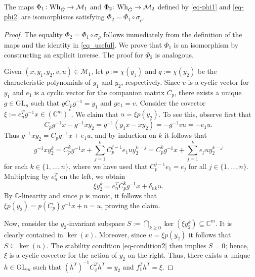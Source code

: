 \documentclass[11pt]{article}
\theoremstyle{definition}
\theoremstyle{plain}
\theoremstyle{remark}
\newcommand{\GL}{\mathrm{GL}}
\newcommand{\numberset}{\mathbb}
\newcommand{\C}{\numberset{C}}
\begin{document}
        \begin{lemma}
            The maps $\Phi_1\colon \mathrm{Wh}_{\Check{G}} \to \mathcal{M}_1$ and $\Phi_2\colon \mathrm{Wh}_{\Check{G}} \to \mathcal{M}_2$ defined by \eqref{eq-phi1} and \eqref{eq-phi2} are isomorphisms satisfying $\Phi_2 = \Phi_1 \circ \sigma_{\rho}$.
        \end{lemma}
        \begin{proof}
            The equality $\Phi_2 = \Phi_1 \circ \sigma_{\rho}$ follows immediately from the definition of the maps and the identity in \eqref{eq_useful}. We prove that $\Phi_1$ is an isomorphism by constructing an explicit inverse. The proof for $\Phi_2$ is analogous.

            Given $(x,y_1,y_2,v,u) \in \mathcal{M}_1$, let $p:=\chi(y_1)$ and $q := \chi(y_2)$ be the characteristic polynomials of $y_1$ and $y_2$, respectively. Since $v$ is a cyclic vector for $y_1$ and $e_1$ is a cyclic vector for the companion matrix $C_p$, there exists a unique $g \in \GL_n$ such that $gC_pg^{-1} = y_1$ and $ge_1 = v$. Consider the covector $\xi:=e_n^Tg^{-1}x \in (\C^m)^*$. We claim that $u = \xi p(y_2)$. To see this, observe first that
            \begin{equation*}
                C_pg^{-1}x-g^{-1}xy_2 = g^{-1}(y_1x-xy_2) = -g^{-1}vu = -e_1u.
            \end{equation*}
            Thus $g^{-1}xy_2 = C_pg^{-1}x+e_1u$, and by induction on $k$ it follows that
            \[
                g^{-1}xy_2^k = C_p^kg^{-1}x+\sum_{j=1}^{k}C_p^{j-1}e_1uy_2^{k-j} = C_p^kg^{-1}x+\sum_{j=1}^{k}e_{j}uy_2^{k-j}
            \]
            for each $k \in \{1,\dots,n\}$, where we have used that $C_p^{j-1}e_1 = e_{j}$ for all $j \in \{1,\dots,n\}$. Multiplying by $e_n^T$ on the left, we obtain
            \[
                \xi y_2^k = e_n^TC_p^kg^{-1}x+\delta_{nk}u.
            \]
            By $\C$-linearity and since $p$ is monic, it follows that $\xi p(y_2) = p(C_p)g^{-1}x + u = u$, proving the claim.

            Now, consider the $y_2$-invariant subspace $S := \bigcap_{k \geq 0}\ker(\xi y_2^k) \subseteq \C^m$. It is clearly contained in $\ker(x)$. Moreover, since $u = \xi p(y_2)$ it follows that $S \subseteq \ker(u)$. The stability condition \eqref{eq-condition2} then implies $S = 0$; hence, $\xi$ is a cyclic covector for the action of $y_2$ on the right. Thus, there exists a unique $h \in \GL_m$ such that $(h^T)^{-1}C_q^Th^T = y_2$ and $f_1^Th^T = \xi$. 
            

\end{proof}
\end{document}
